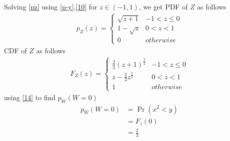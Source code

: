 \documentclass[journal,12pt,twocolumn]{IEEEtran}
\begin{document}
Solving \eqref{pz} using \eqref{p-y},\eqref{10} for $z \in (-1,1)$, we get PDF of $Z$ as follows
\begin{align}
p_{Z}(z)  = 
\begin{cases}
      \sqrt{z+1} & -1 < z \leq 0 \\
      1-\sqrt{z} & 0 < z <1 \\
      0 & otherwise 
\end{cases} \label{13}
\end{align}
CDF of $Z$ as follows
\begin{align}
F_{Z}(z)  = 
\begin{cases}
      \frac{2}{3}{(z+1)}^\frac{3}{2} & -1 < z \leq 0 \\
      z-\frac{2}{3}{z}^\frac{3}{2} & 0 < z < 1 \\
      1 & otherwise
\end{cases} \label{14}
\end{align}
using \eqref{14} to find $p_W(W=0)$
\begin{align}
p_W(W=0) &=\Pr(x^2 <y) \\
         &=F_z(0) \\
         &=\frac{2}{3} \label{15}
\end{align}
\end{document}
